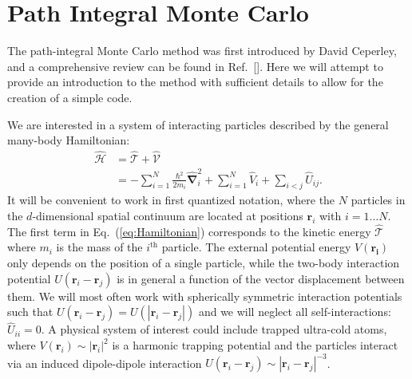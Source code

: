 \documentclass[prb,10pt,aps,floatfix,notitlepage]{revtex4-1}
\renewcommand{\vec}[1]{\boldsymbol{#1}}
\renewcommand{\eqref}[1]{Eq.~(\ref{#1})}
\begin{document}
\section{Path Integral Monte Carlo}

The path-integral Monte Carlo method was first introduced by David Ceperley, and a
comprehensive review can be found in Ref.~[]. Here
we will attempt to provide an introduction to the method with sufficient
details to allow for the creation of a simple code.

We are interested in a system of interacting particles described by the
general many-body Hamiltonian:
%
\begin{align}
    \hat{\mathcal{H}} &= \hat{\mathcal{T}} + \hat{\mathcal{V}} \nonumber \\
                      &= -\sum_{i=1}^N \frac{\hbar^2}{2m_i} \hat{\vec{\nabla}}_i^2 
    + \sum_{i=1}^N \hat{V}_{i} + \sum_{i < j} \hat{U}_{ij}.
\label{eq:Hamiltonian}
\end{align}
%
It will be convenient to work in first quantized notation, where the $N$
particles in the $d$-dimensional spatial continuum are located at positions
$\vec{r}_i$ with $i=1\ldots N$.  The first term in \eqref{eq:Hamiltonian}
corresponds to the kinetic energy $\hat{\mathcal{T}}$ where $m_i$ is the mass
of the $i^{\text{th}}$ particle. The external potential energy $V(\vec{r_i})$
only depends on the position of a single particle, while the two-body
interaction potential $U(\vec{r}_i-\vec{r}_j)$ is in general a function of the
vector displacement between them.  We will most often work with spherically
symmetric interaction potentials such that $U(\vec{r}_i - \vec{r}_j) =
U(|\vec{r}_i-\vec{r}_j|)$ and we will neglect all self-interactions:
$\hat{U}_{ii} = 0$. A physical system of interest could include trapped
ultra-cold atoms, where $V(\vec{r}_i) \sim |\vec{r}_i|^2$ is a harmonic
trapping potential and the particles interact via an induced dipole-dipole
interaction $U(\vec{r}_i - \vec{r}_j) \sim |\vec{r}_i-\vec{r}_j|^{-3}$.
\end{document}
